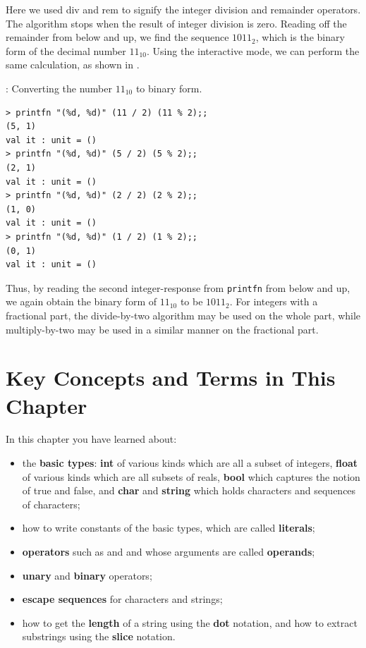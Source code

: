 \documentclass[fsharpNotes.tex]{subfiles}
\begin{document}
%
%
%
%
%
%
%
\hspace*{-0.6mm}Here we used div and rem to signify the integer division and remainder operators. The algorithm stops when the result of integer division is zero. Reading off the remainder from below and up, we find the sequence $1011_2$, which is the binary form of the decimal number $11_{10}$. Using the interactive mode, we can perform the same calculation, as shown in .
\begin{codeNOutput}[label=conversionByHand]{: Converting the number $11_{10}$ to binary form.}
\begin{lstlisting}[language=console]
> printfn "(%d, %d)" (11 / 2) (11 % 2);;
(5, 1)
val it : unit = ()
> printfn "(%d, %d)" (5 / 2) (5 % 2);;  
(2, 1)
val it : unit = ()
> printfn "(%d, %d)" (2 / 2) (2 % 2);;  
(1, 0)
val it : unit = ()
> printfn "(%d, %d)" (1 / 2) (1 % 2);;
(0, 1)
val it : unit = ()
\end{lstlisting}
\end{codeNOutput}
Thus, by reading the second integer-response from \lstinline!printfn! from below and up, we again obtain the binary form of $11_{10}$ to be $1011_2$. For integers with a fractional part, the divide-by-two algorithm may be used on the whole part, while multiply-by-two may be used in a similar manner on the fractional part.


\section{Key Concepts and Terms in This Chapter}
In this chapter you have learned about:
\begin{itemize}
\item the \textbf{basic types}: \textbf{int} of various kinds which are all a subset of integers, \textbf{float} of various kinds which are all subsets of reals, \textbf{bool} which captures the notion of true and false, and \textbf{char} and \textbf{string} which holds characters and sequences of characters;
\item how to write constants of the basic types, which are called \textbf{literals};
\item \textbf{operators} such as \lexeme{+} and \lexeme{-} and whose arguments are called \textbf{operands};
\item \textbf{unary} and \textbf{binary} operators;
\item \textbf{escape sequences} for characters and strings;
\item how to get the \textbf{length} of a string using the \textbf{dot} notation, and how to extract substrings using the \textbf{slice} notation.
\end{itemize}
\end{document}
